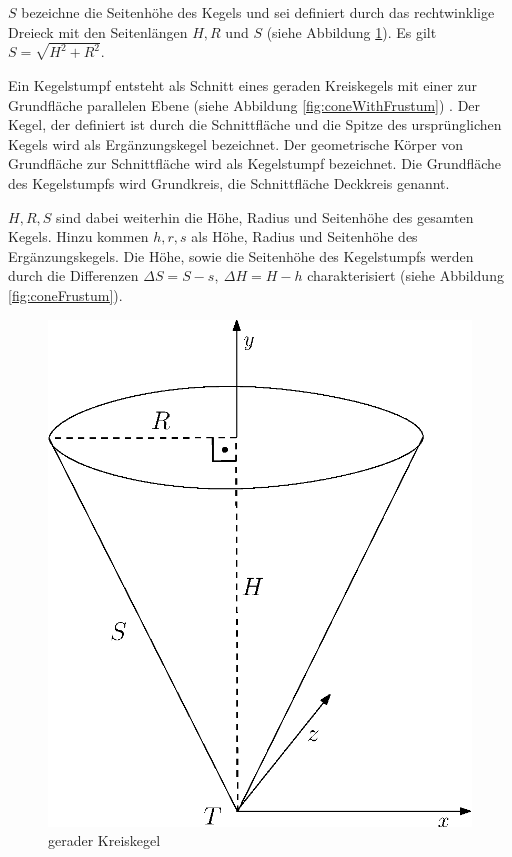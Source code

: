 $S$ bezeichne die Seitenhöhe des Kegels und sei definiert durch das rechtwinklige Dreieck mit den Seitenlängen $H,R$ und $S$ (siehe Abbildung \ref{fig:cone}). Es gilt $S = \sqrt{H^2 + R^2}$.
\bigskip
\begin{definition}
	Ein Kegelstumpf entsteht als Schnitt eines geraden Kreiskegels mit einer zur Grundfläche parallelen Ebene (siehe Abbildung \ref{fig:coneWithFrustum}) \cite{James1992}. Der Kegel, der definiert ist durch die Schnittfläche und die Spitze des ursprünglichen Kegels wird als Ergänzungskegel bezeichnet. Der geometrische Körper von Grundfläche zur Schnittfläche wird als Kegelstumpf bezeichnet. Die Grundfläche des Kegelstumpfs wird Grundkreis, die Schnittfläche Deckkreis genannt.

	$H, R, S$ sind dabei weiterhin die Höhe, Radius und Seitenhöhe des gesamten Kegels. Hinzu kommen $h,r,s$ als Höhe, Radius und Seitenhöhe des Ergänzungskegels. Die Höhe, sowie die Seitenhöhe des Kegelstumpfs werden durch die Differenzen $\Delta S = S - s,~ \Delta H = H-h$ charakterisiert (siehe Abbildung \ref{fig:coneFrustum}).
\end{definition}

\begin{figure}[!htb]
	\centering
	\includegraphics[scale=.5]{images/fullCone.eps}
	\caption{gerader Kreiskegel}
	\label{fig:cone}
\end{figure}

